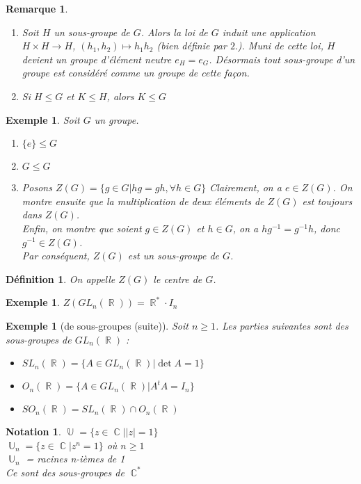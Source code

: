\documentclass[a4paper, oneside]{report}
\theoremstyle{break}
\newtheorem{defi}[thm]{Définition}
\newtheorem{nota}[thm]{Notation}
\newtheorem{exem}[thm]{Exemple}
\newtheorem{remar}[thm]{Remarque}
\newcommand{\x}{\times}
\DeclareMathOperator{\R}{\mathbb{R}}
\DeclareMathOperator{\C}{\mathbb{C}}
\DeclareMathOperator{\U}{\mathbb{U}}
\begin{document}
\begin{remar}
	\begin{enumerate}
		\item Soit $H$ un sous-groupe de $G$. Alors la loi de $G$ induit une application $H\x H \rightarrow H$, $(h_1,h_2)\mapsto h_1h_2$ (bien définie par $2.$). Muni de cette loi, $H$ devient un groupe d'élément neutre $e_H=e_G$. Désormais tout sous-groupe d'un groupe est considéré comme un groupe de cette façon.
		\item Si $H\leq G$ et $K\leq H$, alors $K\leq G$
	\end{enumerate}
\end{remar}

\begin{exem}
	Soit $G$ un groupe.
	
	\begin{enumerate}
		\item $\{e\} \leq G$
		\item $G\leq G$
		\item Posons $Z(G)=\{g\in G | hg=gh, \forall h\in G \}$
		Clairement, on a $e\in Z(G)$. On montre ensuite que la multiplication de deux éléments de $Z(G)$ est toujours dans $Z(G)$.\\
		Enfin, on montre que soient $g\in Z(G)$ et $h\in G$, on a $hg^{-1}=g^{-1}h$, donc $g^{-1}\in Z(G)$.\\
		Par conséquent, $Z(G)$ est un sous-groupe de $G$.
	\end{enumerate}
\end{exem}

\begin{defi}
	On appelle $Z(G)$ le centre de $G$.
\end{defi}

\begin{exem}
	$Z(GL_n(\R)) = \R^* \cdot I_n$
\end{exem}

\begin{exem}[de sous-groupes (suite)]
	Soit $n\geq 1$. Les parties suivantes sont des sous-groupes de $GL_n(\R)$ :
	\begin{itemize}
		\item $SL_n(\R)=\{A\in GL_n(\R) | \det A=1 \}$
		\item $O_n(\R) = \{A\in GL_n(\R) | A^tA=I_n \}$
		\item $SO_n(\R) = SL_n(\R) \cap O_n(\R)$
	\end{itemize}
\end{exem}

\begin{nota}
	$\U = \{z\in \C | |z|=1 \}$\\
	$\U_n = \{z\in \C | z^n =1 \}$ où $n\geq 1$\\
	$\U_n$ = {racines n-ièmes de 1}\\
	Ce sont des sous-groupes de $\C^*$\\
\end{nota}
\end{document}
